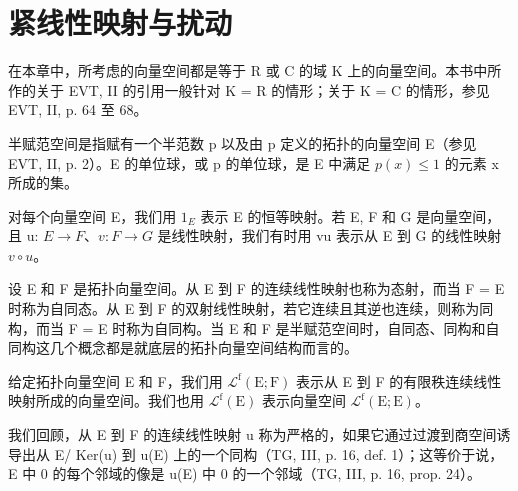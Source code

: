 \chapter{紧线性映射与扰动}
\setcounter{exercisepar}{0}

在本章中，所考虑的向量空间都是等于 R 或 C 的域 K 上的向量空间。本书中所作的关于 EVT, II 的引用一般针对 K = R 的情形；关于 K = C 的情形，参见 EVT, II, p. 64 至 68。

半赋范空间是指赋有一个半范数 p 以及由 p 定义的拓扑的向量空间 E（参见 EVT, II, p. 2）。E 的单位球，或 p 的单位球，是 E 中满足 \(p(x) \leqslant 1\) 的元素 x 所成的集。

对每个向量空间 E，我们用 \(1_{E}\) 表示 E 的恒等映射。若 E, F 和 G 是向量空间，且 u: \(E \rightarrow F\)、\(v: F \rightarrow G\) 是线性映射，我们有时用 vu 表示从 E 到 G 的线性映射 \(v \circ u\)。

设 E 和 F 是拓扑向量空间。从 E 到 F 的连续线性映射也称为态射，而当 F = E 时称为自同态。从 E 到 F 的双射线性映射，若它连续且其逆也连续，则称为同构，而当 F = E 时称为自同构。当 E 和 F 是半赋范空间时，自同态、同构和自同构这几个概念都是就底层的拓扑向量空间结构而言的。

给定拓扑向量空间 E 和 F，我们用 \(\mathcal{L}^{\mathrm{f}}(\mathrm{E};\mathrm{F})\) 表示从 E 到 F 的有限秩连续线性映射所成的向量空间。我们也用 \(\mathcal{L}^{\mathrm{f}}(\mathrm{E})\) 表示向量空间 \(\mathcal{L}^{\mathrm{f}}(\mathrm{E};\mathrm{E})\)。

我们回顾，从 E 到 F 的连续线性映射 u 称为严格的，如果它通过过渡到商空间诱导出从 E/ Ker(u) 到 u(E) 上的一个同构（TG, III, p. 16, def. 1）；这等价于说，E 中 0 的每个邻域的像是 u(E) 中 0 的一个邻域（TG, III, p. 16, prop. 24）。


